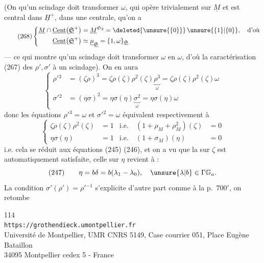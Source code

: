 (On  qu'un scindage doit transformer $\omega$,
qui opère trivialement sur $\underline M$ et est central
dans $\underline H^+$, dans une 
 centrale, 
   qu'on a
\[
\tag{268}
\left\{\begin{aligned}
\underline M\cap\underline{\mathrm{Cent}}\bigl(\underline{\mathfrak S}^+\bigr)
&=\underline M^{\mathfrak S_3}
=\deleted{\unsure{\{0\}}}\,\unsure{\{1\}|\{0\}},\quad\text{d'où}
\\
\underline{\mathrm{Cent}}\bigl(\underline{\mathfrak S}^+\bigr)
&\simeq\underline\mu_{\underline{\mathfrak S}}
=\{1,\omega\}_{\underline{\mathfrak S}}
\end{aligned}\right.
\]
--- ce qui montre qu'un scindage doit transformer $\omega$ en $\omega$,
d'où  la caractérisation (267) des $\rho',\sigma'$
 à un scindage).
On en aura
\[
\left\{\begin{aligned}
\rho'{}^3&=(\zeta\rho)^3
=\zeta\rho(\zeta)\rho^2(\zeta)\underbrace{\rho^3}_{\omega}
=\zeta\rho(\zeta)\rho^2(\zeta)\omega
\\
\sigma'{}^2&=(\eta\sigma)^2
=\eta\sigma(\eta)\underbrace{\sigma^2}_{\omega}
=\eta\sigma(\eta)\omega
\end{aligned}\right.
\]
donc les  équations $\rho'{}^3=\omega$ et
$\sigma'{}^2=\omega$ équivalent respectivement à
\[
\left\{\begin{aligned}
\zeta\rho(\zeta)\rho^2(\zeta)&=1
&\text{i.e.}\quad(1+\rho_M+\rho_M^2)(\zeta)&=0
\\
\eta\sigma(\eta)&=1
&\text{i.e.}\quad(1+\sigma_M)(\eta)&=0
\end{aligned}\right.
\]
i.e. cela se réduit aux équations (245) (246),
et on a vu que la 
sur $\zeta$ est automatiquement satisfaite, celle
sur $\eta$ revient à :
\[
(247)\qquad
\eta=b\delta=b(\lambda_1-\lambda_0),\quad
\unsure{\lambda|b}\in\Gamma\mathbb G_a.
\]
La condition $\sigma'(\rho')=\rho'{}^{-1}$ s'explicite d'autre
part comme à la p.~$700'$, on retombe


\begin{center}
\small
114\\
\texttt{https://grothendieck.umontpellier.fr}\\
Université de Montpellier, UMR CNRS 5149, Case courrier 051, Place Eugène Bataillon\\
34095 Montpellier cedex 5 - France
\end{center}

